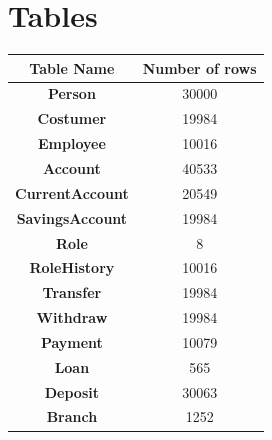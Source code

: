 \documentclass[a4paper, 10pt]{article}
\begin{document}
\section{Tables}
\begin{table}[H]
  \centering
\begin{tabular}{|c|c|}
\hline
\textbf{Table Name}     & \textbf{Number of rows} \\ \hline
\textbf{Person}         & 30000                   \\ \hline
\textbf{Costumer}       & 19984                   \\ \hline
\textbf{Employee}       & 10016                   \\ \hline
\textbf{Account}        & 40533                   \\ \hline
\textbf{CurrentAccount} & 20549                   \\ \hline
\textbf{SavingsAccount} & 19984                   \\ \hline
\textbf{Role}           & 8                       \\ \hline
\textbf{RoleHistory}    & 10016                   \\ \hline
\textbf{Transfer}       & 19984                   \\ \hline
\textbf{Withdraw}       & 19984                   \\ \hline
\textbf{Payment}        & 10079                   \\ \hline
\textbf{Loan}           & 565                     \\ \hline
\textbf{Deposit}        & 30063                   \\ \hline
\textbf{Branch}         & 1252                    \\ \hline
\end{tabular}
\end{table}
\end{document}
